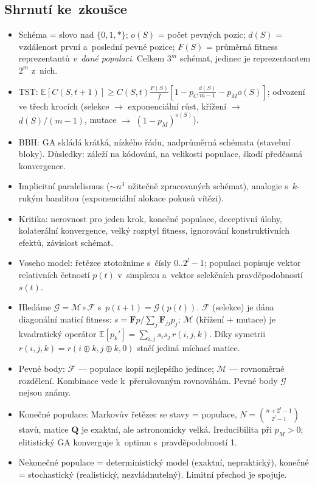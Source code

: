 \documentclass[11pt,a4paper]{article}
\theoremstyle{definition}
\begin{document}
\subsection{Shrnutí ke~zkoušce}

\begin{itemize}
\item Schéma = slovo nad $\{0,1,*\}$; $o(S)$ = počet pevných pozic;
  $d(S)$ = vzdálenost první a~poslední pevné pozice; $F(S)$ = průměrná fitness
  reprezentantů \emph{v~dané populaci}. Celkem $3^m$ schémat, jedinec je
  reprezentantem $2^m$ z~nich.
\item TST: $\mathbb{E}[C(S,t+1)] \ge C(S,t)\frac{F(S)}{\bar f}
  [1 - p_C \frac{d(S)}{m-1} - p_M o(S)]$; odvození ve třech krocích
  (selekce $\to$ exponenciální růst, křížení $\to$ $d(S)/(m-1)$,
  mutace $\to$ $(1-p_M)^{o(S)}$).
\item BBH: GA skládá krátká, nízkého řádu, nadprůměrná schémata (stavební
  bloky). Důsledky: záleží na kódování, na velikosti populace, škodí předčasná
  konvergence.
\item Implicitní paralelismus ($\sim n^3$ užitečně zpracovaných schémat),
  analogie s~$k$-rukým banditou (exponenciální alokace pokusů vítězi).
\item Kritika: nerovnost pro jeden krok, konečné populace, deceptivní úlohy,
  kolaterální konvergence, velký rozptyl fitness, ignorování konstruktivních
  efektů, závislost schémat.
\item Voseho model: řetězce ztotožníme s~čísly $0..2^l-1$; populaci popisuje
  vektor relativních četností $p(t)$ v~simplexu a~vektor selekčních
  pravděpodobností $s(t)$.
\item Hledáme $\mathcal{G} = \mathcal{M} \circ \mathcal{F}$ s~$p(t+1)=\mathcal{G}(p(t))$.
  $\mathcal{F}$ (selekce) je dána diagonální maticí fitness:
  $s = \mathbf{F}p / \sum_j \mathbf{F}_{jj}p_j$;
  $\mathcal{M}$ (křížení + mutace) je kvadratický operátor
  $\mathbb{E}[p_k'] = \sum_{i,j} s_i s_j\, r(i,j,k)$. Díky symetrii
  $r(i,j,k) = r(i\oplus k, j \oplus k, 0)$ stačí jediná míchací matice.
\item Pevné body: $\mathcal{F}$ --- populace kopií nejlepšího jedince;
  $\mathcal{M}$ --- rovnoměrné rozdělení. Kombinace vede k~přerušovaným
  rovnováhám. Pevné body $\mathcal{G}$ nejsou známy.
\item Konečné populace: Markovův řetězec se stavy = populace,
  $N = \binom{n+2^l-1}{2^l-1}$ stavů, matice $\mathbf{Q}$ je exaktní, ale
  astronomicky velká. Ireducibilita při $p_M>0$; elitistický GA konverguje
  k~optimu s~pravděpodobností 1.
\item Nekonečné populace = deterministický model (exaktní, nepraktický),
  konečné = stochastický (realistický, nezvládnutelný). Limitní přechod je
  spojuje.
\end{itemize}
\end{document}
